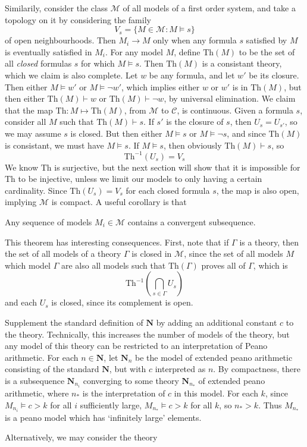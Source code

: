 Similarily, consider the class $\mathcal{M}$ of all models of a first order system, and take a topology on it by considering the family
%
\[ V_s = \{ M \in \mathcal{M} : M \vDash s \} \]
%
of open neighbourhoods. Then $M_i \to M$ only when any formula $s$ satisfied by $M$ is eventually satisfied in $M_i$. For any model $M$, define $\text{Th}(M)$ to be the set of all {\it closed} formulas $s$ for which $M \vDash s$. Then $\text{Th}(M)$ is a consistant theory, which we claim is also complete. Let $w$ be any formula, and let $w'$ be its closure. Then either $M \vDash w'$ or $M \vDash \neg w'$, which implies either $w$ or $w'$ is in $\text{Th}(M)$, but then either $\text{Th}(M) \vdash w$ or $\text{Th}(M) \vdash \neg w$, by universal elimination. We claim that the map $\text{Th}: M \mapsto \text{Th}(M)$, from $\mathcal{M}$ to $\mathcal{C}$, is continuous. Given a formula $s$, consider all $M$ such that $\text{Th}(M) \vdash s$. If $s'$ is the closure of $s$, then $U_s = U_{s'}$, so we may assume $s$ is closed. But then either $M \vDash s$ or $M \vDash \neg s$, and since $\text{Th}(M)$ is consistant, we must have $M \vDash s$. If $M \vDash s$, then obviously $\text{Th}(M) \vdash s$, so
%
\[ \text{Th}^{-1}(U_s) = V_s \]
%
We know $\text{Th}$ is surjective, but the next section will show that it is impossible for $\text{Th}$ to be injective, unless we limit our models to only having a certain cardinality. Since $\text{Th}(U_s) = V_s$ for each closed formula $s$, the map is also open, implying $\mathcal{M}$ is compact. A useful corollary is that

\begin{theorem}
    Any sequence of models $M_i \in \mathcal{M}$ contains a convergent subsequence.
\end{theorem}

This theorem has interesting consequences. First, note that if $\Gamma$ is a theory, then the set of all models of a theory $\Gamma$ is closed in $\mathcal{M}$, since the set of all models $M$ which model $\Gamma$ are also all models such that $\text{Th}(\Gamma)$ proves all of $\Gamma$, which is
%
\[ \text{Th}^{-1} \left(\bigcap_{s \in \Gamma} U_s \right) \]
%
and each $U_s$ is closed, since its complement is open.

\begin{example}
    Supplement the standard definition of $\mathbf{N}$ by adding an additional constant $c$ to the theory. Technically, this increases the number of models of the theory, but any model of this theory can be restricted to an interpretation of Peano arithmetic. For each $n \in \mathbf{N}$, let $\mathbf{N}_n$ be the model of extended peano arithmetic consisting of the standard $\mathbf{N}$, but with $c$ interpreted as $n$. By compactness, there is a subsequence $\mathbf{N}_{n_i}$ converging to some theory $\mathbf{N}_{n_*}$ of extended peano arithmetic, where $n_*$ is the interpretation of $c$ in this model. For each $k$, since $M_{n_i} \vDash c > k$ for all $i$ sufficiently large, $M_{n_*} \vDash c > k$ for all $k$, so $n_* > k$. Thus $M_{n_*}$ is a peano model which has `infinitely large' elements.

    Alternatively, we may consider the theory
\end{example}


